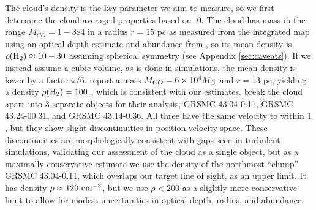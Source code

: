 % 
% 
The cloud's density is the key parameter we aim to measure, so we first determine the cloud-averaged
properties based on -0.
The cloud has mass in the range $M_{CO} = 1-3\ee{4}$ \msun in a radius $r=15$ pc as measured
from the integrated \thirteenco map using an optical depth estimate and
abundance from \citet{Roman-Duval2010a}, so its mean density is $\rho(\textrm{H}_{2}) \approx
10-30$ \percc assuming spherical symmetry (see Appendix \ref{sec:caveats}).  If we
instead assume a cubic volume, as is done in simulations, the mean density is lower by a factor $\pi/6$. 
\citet{Simon2001a} report a mass $M_{CO} = 6\times10^{4} M_{\odot}$ and $r=13$ pc,
yielding a density $\rho(\textrm{H}_{2})=100$ \percc, which is consistent with our estimates.
\citet{Roman-Duval2010a} break the cloud apart into 3 separate objects for their
analysis, GRSMC 43.04-0.11, GRSMC 43.24-00.31, and GRSMC 43.14-0.36.  All three
have the same velocity to within 1 \kms, but they show slight discontinuities
in position-velocity space.  These discontinuities are morphologically consistent
with gaps seen in turbulent simulations, validating our assessment of the cloud as a
single object, but as a maximally conservative estimate we use the density of the
northmost ``clump'' GRSMC 43.04-0.11, which overlaps our target line of sight,
as an upper limit.  It has density $\rho\approx120~\textrm{cm}^{-3}$, but we use $\rho<200$ \percc
as a slightly more conservative limit to allow for modest uncertainties in
optical depth, radius, and abundance.




